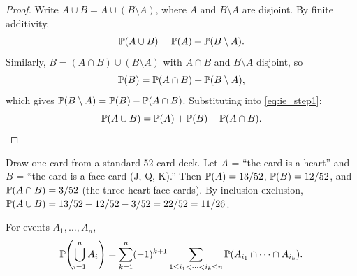 \documentclass[11pt,a4paper]{article}
\begin{document}
\begin{proof}
Write $A \cup B = A \cup (B \setminus A)$, where $A$ and $B \setminus A$
are disjoint. By finite additivity,
\begin{equation}
\label{eq:ie_step1}
    \mathbb{P}(A \cup B) = \mathbb{P}(A) + \mathbb{P}(B \setminus A).
\end{equation}
Similarly, $B = (A \cap B) \cup (B \setminus A)$ with
$A \cap B$ and $B \setminus A$ disjoint, so
\begin{equation}
\label{eq:ie_step2}
    \mathbb{P}(B) = \mathbb{P}(A \cap B) + \mathbb{P}(B \setminus A),
\end{equation}
which gives $\mathbb{P}(B \setminus A) = \mathbb{P}(B) - \mathbb{P}(A \cap B)$.
Substituting into \eqref{eq:ie_step1}:
\[
    \mathbb{P}(A \cup B) = \mathbb{P}(A) + \mathbb{P}(B) - \mathbb{P}(A \cap B). \qedhere
\]
\end{proof}

\begin{example}
\label{ex:ie_applied}
Draw one card from a standard 52-card deck. Let $A$ = ``the card is a
heart'' and $B$ = ``the card is a face card (J, Q, K).'' Then
$\mathbb{P}(A) = 13/52$, $\mathbb{P}(B) = 12/52$, and
$\mathbb{P}(A \cap B) = 3/52$ (the three heart face cards). By
inclusion-exclusion,
$\mathbb{P}(A \cup B) = 13/52 + 12/52 - 3/52 = 22/52 = 11/26$.
\end{example}

\begin{theorem}
\label{thm:ie_n}
For events $A_1, \ldots, A_n$,
\[
    \mathbb{P}\!\left(\bigcup_{i=1}^n A_i\right)
    = \sum_{k=1}^n (-1)^{k+1}
    \sum_{1 \leq i_1 < \cdots < i_k \leq n}
    \mathbb{P}(A_{i_1} \cap \cdots \cap A_{i_k}).
\]
\end{theorem}
\end{document}
